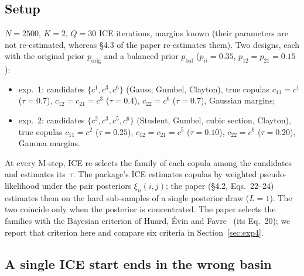 \documentclass[11pt,a4paper]{article}
\newcommand{\porig}{p_{\text{orig}}}
\newcommand{\pbal}{p_{\text{bal}}}
\begin{document}
\subsection{Setup}

$N=2500$, $K=2$, $Q=30$ ICE iterations, margins known (their parameters are
not re-estimated, whereas §4.3 of the paper re-estimates them). Two designs, each with the original prior $\porig$ and a
balanced prior $\pbal$ ($p_{ii}=0.35$, $p_{12}=p_{21}=0.15$):
\begin{itemize}
  \item exp.~1: candidates $\{c^1,c^3,c^6\}$ (Gauss, Gumbel, Clayton), true
        copulas $c_{11}=c^1$ ($\tau=0.7$), $c_{12}=c_{21}=c^3$ ($\tau=0.4$),
        $c_{22}=c^6$ ($\tau=0.7$), Gaussian margins;
  \item exp.~2: candidates $\{c^2,c^3,c^5,c^6\}$ (Student, Gumbel, cubic
        section, Clayton), true copulas $c_{11}=c^2$ ($\tau=0.25$),
        $c_{12}=c_{21}=c^5$ ($\tau=0.10$), $c_{22}=c^6$ ($\tau=0.20$),
        Gamma margins.
\end{itemize}
At every M-step, ICE re-selects the family of each copula among the
candidates and estimates its~$\tau$. The package's ICE estimates copulas by
weighted pseudo-likelihood under the pair posteriors $\xi_n(i,j)$; the paper
(§4.2, Eqs.~22--24) estimates them on the hard sub-samples of a single
posterior draw ($L=1$). The two coincide only when the posterior is
concentrated. The paper selects the families with the Bayesian criterion of
Huard, \'Evin and Favre~\cite{huard2006} (its Eq.~20); we report that
criterion here and compare six criteria in Section~\ref{sec:exp4}.

\subsection{A single ICE start ends in the wrong basin}\label{sec:exp3-basin}
\end{document}
